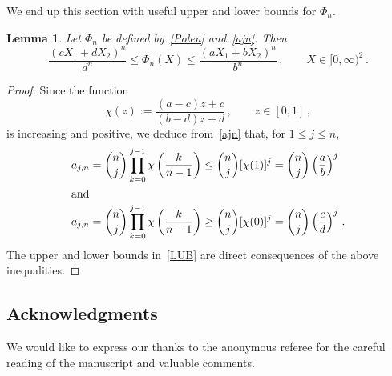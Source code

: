 \documentclass[10pt]{amsart}
\newtheorem{lemm}[theo]{Lemma}\newtheorem{prop}[theo]{Proposition}\newtheorem{coro}[theo]{Corollary}\newtheorem{conj}[theo]{Conjecture}
\theoremstyle{definition}\newtheorem{defi}[theo]{Definition}\newtheorem{rema}[theo]{Remark}\newtheorem{exam}[theo]{Example}\newtheorem{exem}[theo]{Example}\newtheorem{nota}[theo]{Notation}
\begin{document}
We end up this section with useful upper and lower bounds for $\Phi_n$.


\begin{lemm}\label{lelfb}
Let $\Phi_n$ be defined by~\eqref{Polen} and~\eqref{ajn}. Then
\begin{equation}\label{LUB}
\frac{(c X_1 + d X_2)^n}{d^n} \le \Phi_n(X) \le \frac{(a X_1 + b X_2)^n}{b^n}\,, \qquad X\in [0,\infty)^2\,.
\end{equation}
\end{lemm}


\begin{proof}
Since the function
\begin{equation*}
\chi (z) := \frac{ (a-c) z+c}{(b-d) z+d}\,, \qquad z\in [0,1]\,,
\end{equation*}
is increasing and positive, we deduce from~\eqref{ajn} that, for $1\le j \le n$,
\begin{align*}
a_{j,n} &= \binom{n}{j} \prod_{k=0}^{j-1}\chi\left(\frac{k}{n-1} \right)\leq \binom{n}{j} [\chi(1)]^j=\binom{n}{j} \left(\frac{a}{b} \right)^j\\
\intertext{and}
a_{j,n} &= \binom{n}{j} \prod_{k=0}^{j-1}\chi\left(\frac{k}{n-1} \right)\geq \binom{n}{j} [\chi(0)]^j=\binom{n}{j} \left(\frac{c}{d} \right)^j\,.
\end{align*}
The upper and lower bounds in~\eqref{LUB} are direct consequences of the above inequalities.
\end{proof}


\subsection*{Acknowledgments}
We would like to express our thanks to the anonymous referee for the careful reading of the manuscript and valuable comments.
\end{document}
